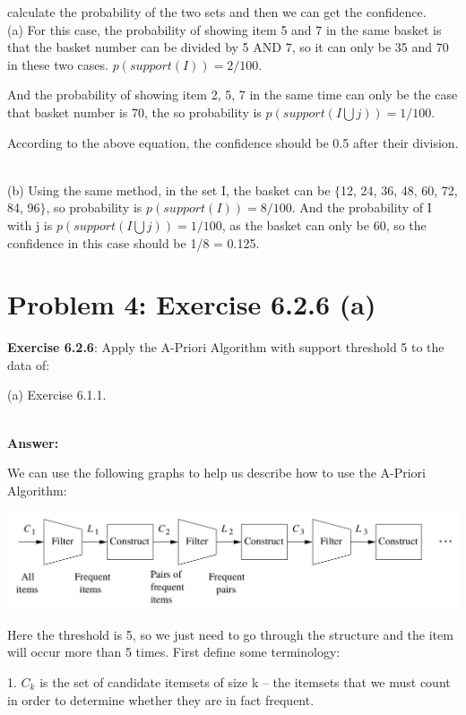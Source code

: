 \documentclass{article}
\begin{document}
calculate the probability of the two sets and then we can get the confidence.
~\\

(a) For this case, the probability of showing item 5 and 7 in the same basket is that the basket number can be divided by 5 AND 7, so it can only be 35 and 70 in these two cases. $p(support(I)) = 2/100$.

And the probability of showing item 2, 5, 7 in the same time can only be the case that basket number is 70, the so probability is $p(support(I \bigcup j)) = 1/100$.

According to the above equation, the confidence should be 0.5 after their division.

~\\
(b) Using the same method, in the set I, the basket can be $\{$12, 24, 36, 48, 60, 72, 84, 96$\}$, so probability is $p(support(I)) = 8/100$. And the probability of I with j is $p(support(I \bigcup j)) =  1/100$, as the basket can only be 60, so the confidence in this case should be 1/8 = 0.125.



\section{Problem 4: Exercise 6.2.6 (a)}

\textbf{Exercise 6.2.6}: Apply the A-Priori Algorithm with support threshold 5 to the data of:

(a) Exercise 6.1.1.

~\\
\textbf{Answer:}

We can use the following graphs to help us describe how to use the A-Priori Algorithm:

\begin{center}
\includegraphics[scale=0.3]{hw4_p5.png}
\end{center}

Here the threshold is 5, so we just need to go through the structure and the item will occur more than 5 times. First define some terminology:

1. $C_k$ is the set of candidate itemsets of size k – the itemsets that we must count in order to determine whether they are in fact frequent.
\end{document}
